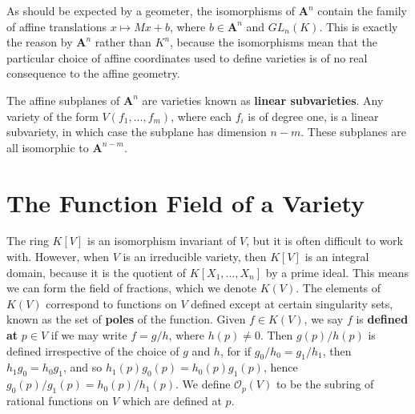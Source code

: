 As should be expected by a geometer, the isomorphisms of $\mathbf{A}^n$ contain the family of affine translations $x \mapsto Mx + b$, where $b \in \mathbf{A}^n$ and $GL_n(K)$. This is exactly the reason by $\mathbf{A}^n$ rather than $K^n$, because the isomorphisms mean that the particular choice of affine coordinates used to define varieties is of no real consequence to the affine geometry.

\begin{example}
    The affine subplanes of $\mathbf{A}^n$ are varieties known as {\bf linear subvarieties}. Any variety of the form $V(f_1, \dots, f_m)$, where each $f_i$ is of degree one, is a linear subvariety, in which case the subplane has dimension $n-m$. These subplanes are all isomorphic to $\mathbf{A}^{n-m}$.
\end{example}

\section{The Function Field of a Variety}

The ring $K[V]$ is an isomorphism invariant of $V$, but it is often difficult to work with. However, when $V$ is an irreducible variety, then $K[V]$ is an integral domain, because it is the quotient of $K[X_1, \dots, X_n]$ by a prime ideal. This means we can form the field of fractions, which we denote $K(V)$. The elements of $K(V)$ correspond to functions on $V$ defined except at certain singularity sets, known as the set of {\bf poles} of the function. Given $f \in K(V)$, we say $f$ is {\bf defined at} $p \in V$ if we may write $f = g/h$, where $h(p) \neq 0$. Then $g(p)/h(p)$ is defined irrespective of the choice of $g$ and $h$, for if $g_0/h_0 = g_1/h_1$, then $h_1g_0 = h_0g_1$, and so $h_1(p)g_0(p) = h_0(p)g_1(p)$, hence $g_0(p)/g_1(p) = h_0(p)/h_1(p)$. We define $\mathcal{O}_p(V)$ to be the subring of rational functions on $V$ which are defined at $p$.

